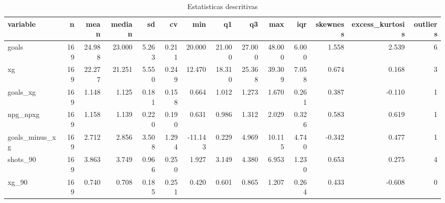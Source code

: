 \begin{table}

\caption{\label{tab:desc_g20}Estatisticas descritivas}
\centering
\begin{tabular}[t]{lrrrrrrrrrrrrr}
\toprule
variable & n & mean & median & sd & cv & min & q1 & q3 & max & iqr & skewness & excess\_kurtosis & outliers\\
\midrule
goals & 169 & 24.988 & 23.000 & 5.263 & 0.211 & 20.000 & 21.000 & 27.000 & 48.000 & 6.000 & 1.558 & 2.539 & 6\\
xg & 169 & 22.277 & 21.251 & 5.550 & 0.249 & 12.470 & 18.310 & 25.368 & 39.309 & 7.058 & 0.674 & 0.168 & 3\\
goals\_xg & 169 & 1.148 & 1.125 & 0.181 & 0.158 & 0.664 & 1.012 & 1.273 & 1.670 & 0.261 & 0.387 & -0.110 & 1\\
npg\_npxg & 169 & 1.158 & 1.139 & 0.220 & 0.190 & 0.631 & 0.986 & 1.312 & 2.029 & 0.326 & 0.583 & 0.619 & 1\\
goals\_minus\_xg & 169 & 2.712 & 2.856 & 3.508 & 1.294 & -11.143 & 0.229 & 4.969 & 10.115 & 4.740 & -0.342 & 0.477 & 1\\
\addlinespace
shots\_90 & 169 & 3.863 & 3.749 & 0.966 & 0.250 & 1.927 & 3.149 & 4.380 & 6.953 & 1.230 & 0.653 & 0.275 & 4\\
xg\_90 & 169 & 0.740 & 0.708 & 0.185 & 0.251 & 0.420 & 0.601 & 0.865 & 1.207 & 0.264 & 0.433 & -0.608 & 0\\
\bottomrule
\end{tabular}
\end{table}
